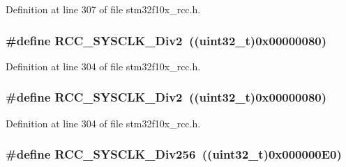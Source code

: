 Definition at line 307 of file stm32f10x\+\_\+rcc.\+h.

\subsubsection[{\texorpdfstring{R\+C\+C\+\_\+\+S\+Y\+S\+C\+L\+K\+\_\+\+Div2}{RCC_SYSCLK_Div2}}]{\setlength{\rightskip}{0pt plus 5cm}\#define R\+C\+C\+\_\+\+S\+Y\+S\+C\+L\+K\+\_\+\+Div2~(({\bf uint32\+\_\+t})0x00000080)}\hypertarget{group___a_h_b__clock__source_gacadd82156776154a07d128b454fc69fd}{}\label{group___a_h_b__clock__source_gacadd82156776154a07d128b454fc69fd}


Definition at line 304 of file stm32f10x\+\_\+rcc.\+h.

\subsubsection[{\texorpdfstring{R\+C\+C\+\_\+\+S\+Y\+S\+C\+L\+K\+\_\+\+Div2}{RCC_SYSCLK_Div2}}]{\setlength{\rightskip}{0pt plus 5cm}\#define R\+C\+C\+\_\+\+S\+Y\+S\+C\+L\+K\+\_\+\+Div2~(({\bf uint32\+\_\+t})0x00000080)}\hypertarget{group___a_h_b__clock__source_gacadd82156776154a07d128b454fc69fd}{}\label{group___a_h_b__clock__source_gacadd82156776154a07d128b454fc69fd}


Definition at line 304 of file stm32f10x\+\_\+rcc.\+h.

\subsubsection[{\texorpdfstring{R\+C\+C\+\_\+\+S\+Y\+S\+C\+L\+K\+\_\+\+Div256}{RCC_SYSCLK_Div256}}]{\setlength{\rightskip}{0pt plus 5cm}\#define R\+C\+C\+\_\+\+S\+Y\+S\+C\+L\+K\+\_\+\+Div256~(({\bf uint32\+\_\+t})0x000000\+E0)}\hypertarget{group___a_h_b__clock__source_gaa28bb876893b3267a813fc98a462d5ee}{}\label{group___a_h_b__clock__source_gaa28bb876893b3267a813fc98a462d5ee}


